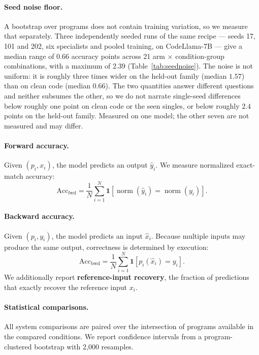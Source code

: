 \paragraph{Seed noise floor.} A bootstrap over programs does not contain training variation, so
we measure that separately. Three independently seeded runs of the same recipe --- seeds 17, 101
and 202, six specialists and pooled training, on CodeLlama-7B --- give a median range of $0.66$
accuracy points across 21 arm $\times$ condition-group combinations, with a maximum of $2.39$
(Table~\ref{tab:seednoise}). The noise is not uniform: it is roughly three times wider on the
held-out family (median $1.57$) than on clean code (median $0.66$). The two quantities answer
different questions and neither subsumes the other, so we do not narrate single-seed differences
below roughly one point on clean code or the seen singles, or below roughly $2.4$ points on the
held-out family. Measured on one model; the other seven are not measured and may differ.



\paragraph{Forward accuracy.}
Given $(p_i, x_i)$, the model predicts an output $\hat{y}_i$. We measure
normalized exact-match accuracy:
\[
\mathrm{Acc}_{\mathrm{fwd}}
=
\frac{1}{N}
\sum_{i=1}^{N}
\mathbf{1}
\!\left[
\operatorname{norm}(\hat{y}_i)
=
\operatorname{norm}(y_i)
\right].
\]

\paragraph{Backward accuracy.}
Given $(p_i, y_i)$, the model predicts an input $\hat{x}_i$. Because multiple
inputs may produce the same output, correctness is determined by execution:
\[
\mathrm{Acc}_{\mathrm{bwd}}
=
\frac{1}{N}
\sum_{i=1}^{N}
\mathbf{1}
\!\left[
p_i(\hat{x}_i) = y_i
\right].
\]
We additionally report \textbf{reference-input recovery}, the fraction of
predictions that exactly recover the reference input $x_i$.

\paragraph{Statistical comparisons.}
All system comparisons are paired over the intersection of programs available
in the compared conditions. We report confidence intervals from a
program-clustered bootstrap with 2,000 resamples. 